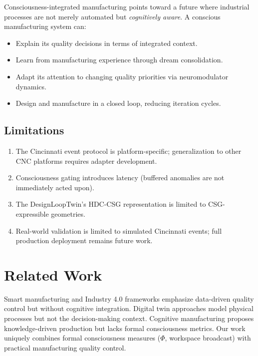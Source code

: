 \documentclass[11pt,a4paper]{article}
\begin{document}
Consciousness-integrated manufacturing points toward a future where industrial processes are not merely automated but \emph{cognitively aware}. A conscious manufacturing system can:
\begin{itemize}[nosep]
    \item Explain its quality decisions in terms of integrated context.
    \item Learn from manufacturing experience through dream consolidation.
    \item Adapt its attention to changing quality priorities via neuromodulator dynamics.
    \item Design and manufacture in a closed loop, reducing iteration cycles.
\end{itemize}

\subsection{Limitations}

\begin{enumerate}[nosep]
    \item The Cincinnati event protocol is platform-specific; generalization to other CNC platforms requires adapter development.
    \item Consciousness gating introduces latency (buffered anomalies are not immediately acted upon).
    \item The DesignLoopTwin's HDC-CSG representation is limited to CSG-expressible geometries.
    \item Real-world validation is limited to simulated Cincinnati events; full production deployment remains future work.
\end{enumerate}

\section{Related Work}

Smart manufacturing \citep{kusiak2018} and Industry 4.0 \citep{lasi2014} frameworks emphasize data-driven quality control but without cognitive integration. Digital twin approaches \citep{grieves2014,tao2018} model physical processes but not the decision-making context. Cognitive manufacturing \citep{zheng2018} proposes knowledge-driven production but lacks formal consciousness metrics. Our work uniquely combines formal consciousness measures ($\Phi$, workspace broadcast) with practical manufacturing quality control.
\end{document}
